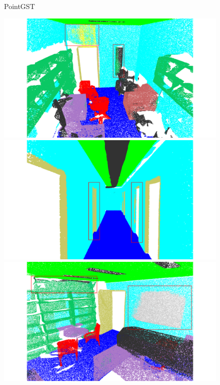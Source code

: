 \begin{figure}[htbp]
    \begin{minipage}{0.09\textwidth}
        \centering
        PointGST
    \end{minipage}
    \hfill
    \begin{minipage}{0.22\textwidth}
        \centering
        \includegraphics[width=\textwidth]{fig/supplement/semantic_segmentation/office_9/PointGST_office_9.pdf}
    \end{minipage}
    \hfill
    \begin{minipage}{0.22\textwidth}
        \centering
        \includegraphics[width=\textwidth]{fig/supplement/semantic_segmentation/hallway_10/PointGST_hallway_10.pdf}
    \end{minipage}
    \hfill
    \begin{minipage}{0.22\textwidth}
        \centering
        \includegraphics[width=\textwidth]{fig/supplement/semantic_segmentation/office_35/PointGST_office_35.pdf}

\end{minipage}
\end{figure}
